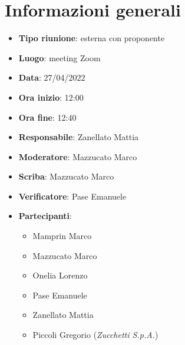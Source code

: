 \section{Informazioni generali}
\begin{itemize}
  \item \textbf{Tipo riunione}: esterna con proponente
  \item \textbf{Luogo}: meeting Zoom
  \item \textbf{Data}: 27/04/2022
  \item \textbf{Ora inizio}: 12:00
  \item \textbf{Ora fine}: 12:40
  \item \textbf{Responsabile}: Zanellato Mattia
  \item \textbf{Moderatore}: Mazzucato Marco
  \item \textbf{Scriba}: Mazzucato Marco
  \item \textbf{Verificatore}: Pase Emanuele
  \item \textbf{Partecipanti}:
  \begin{itemize}
    \item Mamprin Marco
    \item Mazzucato Marco
    \item Onelia Lorenzo
    \item Pase Emanuele
    \item Zanellato Mattia
    \item Piccoli Gregorio (\textit{Zucchetti S.p.A.})
  \end{itemize}
\end{itemize}
